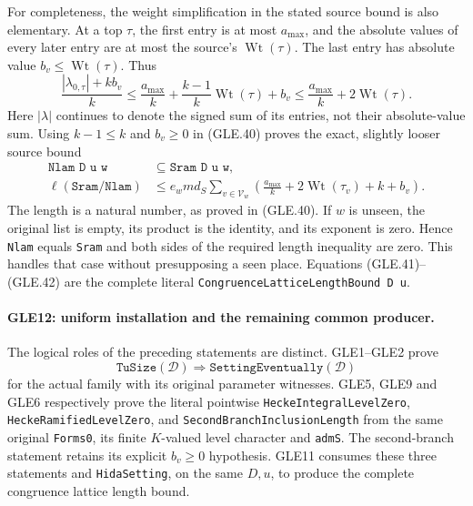 For completeness, the weight simplification in the stated source
bound is also elementary.  At a top $\tau$, the first entry is
at most $a_{\max}$, and the absolute values of every later entry
are at most the source's $\operatorname{Wt}(\tau)$.  The last
entry has absolute value $b_v\le\operatorname{Wt}(\tau)$.
Thus
\[
 \frac{|\lambda_{0,\tau}|+kb_v}{k}
 \le \frac{a_{\max}}k+
       \frac{k-1}{k}\operatorname{Wt}(\tau)+b_v
 \le \frac{a_{\max}}k+2\operatorname{Wt}(\tau).
\]
Here $|\lambda|$ continues to denote the signed sum of its entries,
not their absolute-value sum.  Using $k-1\le k$ and $b_v\ge0$ in
(GLE.40) proves the exact, slightly looser source bound
\[
 \begin{split}
 \texttt{Nlam D u w}&\subseteq\texttt{Sram D u w},\\
 \ell(\texttt{Sram}/\texttt{Nlam})
 &\le e_w m d_S
   \sum_{v\in\mathcal V_w}
     \left(\frac{a_{\max}}k+2\operatorname{Wt}(\tau_v)+k+b_v\right).
 \end{split}                                                  \tag{GLE.42}
\]
The length is a natural number, as proved in (GLE.40).
If $w$ is unseen, the original list is empty, its product is the
identity, and its exponent is zero.  Hence \texttt{Nlam} equals
\texttt{Sram} and both sides of the required length inequality are
zero.  This handles that case without presupposing a seen place.
Equations (GLE.41)--(GLE.42) are the complete literal
\texttt{CongruenceLatticeLengthBound D u}.

\paragraph{GLE12: uniform installation and the remaining common producer.}
\label{claim:GLE12}
The logical roles of the preceding statements are distinct.
GLE1--GLE2 prove
\[
             \texttt{TuSize}(\mathcal D)
                 \Longrightarrow\texttt{SettingEventually}(\mathcal D)
                                                               \tag{GLE.43}
\]
for the actual family with its original parameter witnesses.
GLE5, GLE9 and GLE6 respectively prove the literal pointwise
\texttt{HeckeIntegralLevelZero}, \texttt{HeckeRamifiedLevelZero},
and \texttt{SecondBranchInclusionLength} from the same original
\texttt{Forms0}, its finite $K$-valued level character and
\texttt{admS}.  The second-branch statement retains its explicit
$b_v\ge0$ hypothesis.  GLE11 consumes these three statements and
\texttt{HidaSetting}, on the same $D,u$, to produce the complete
congruence lattice length bound.

